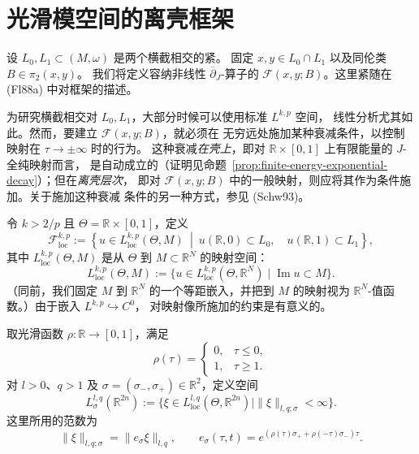 \section{光滑\personFloer{}模空间的离壳框架}
\label{sec:off-shell-framework-smooth-floer}

设 $L_0,L_1\subset(M,\omega)$ 是两个横截相交的紧\termLagrangianSubmanifold{}。
固定 $x,y\in L_0\cap L_1$ 以及同伦类 $B\in\pi_2(x,y)$。
我们将定义容纳非线性 $\overline\partial_J$-算子的\termBanachManifold{}
$\mathcal F(x,y;B)$。这里紧随\personFloer{}在 (Fl88a) 中对\termWeightedSobolevSpace{}框架的描述。

\begin{remark}
\label{rem:weighted-off-shell-decay}
为研究横截相交对 $L_0,L_1$，大部分时候可以使用标准 $L^{k,p}$ \personSobolev{}空间，
线性分析尤其如此。然而，要建立\termBanachManifold{} $\mathcal F(x,y;B)$，就必须在
无穷远处施加某种衰减条件，以控制映射在 $\tau\to\pm\infty$ 时的行为。
这种衰减\emph{在壳上}，即对 $\mathbb R\times[0,1]$ 上有限能量的 $J$-全纯映射而言，
是自动成立的（证明见命题~\ref{prop:finite-energy-exponential-decay}）；但在\emph{离壳层次}，
即对 $\mathcal F(x,y;B)$ 中的一般映射，则应将其作为条件施加。关于施加这种衰减
条件的另一种方式，参见 (Schw93)。
\end{remark}

令 $k>2/p$ 且 $\Theta=\mathbb R\times[0,1]$，定义
\[
 \mathcal F_{\mathrm{loc}}^{k,p}
 :=\left\{u\in L_{\mathrm{loc}}^{k,p}(\Theta,M)\ \middle|\
 u(\mathbb R,0)\subset L_0,\quad u(\mathbb R,1)\subset L_1\right\},
\]
其中 $L_{\mathrm{loc}}^{k,p}(\Theta,M)$ 是从 $\Theta$ 到 $M\subset\mathbb R^N$
的\personSobolev{}映射空间：
\[
 L_{\mathrm{loc}}^{k,p}(\Theta,M)
 :=\{u\in L_{\mathrm{loc}}^{k,p}(\Theta,\mathbb R^N)\mid\operatorname{Im}u\subset M\}.
\]
（同前，我们固定 $M$ 到 $\mathbb R^N$ 的一个等距嵌入，并把到 $M$ 的映射视为
$\mathbb R^N$-值函数。）由于\personSobolev{}嵌入 $L^{k,p}\hookrightarrow C^0$，
对映射像所施加的约束是有意义的。

取光滑函数 $\rho:\mathbb R\to[0,1]$，满足
\begin{equation}
 \rho(\tau)=
 \begin{cases}
 0,&\tau\leq0,\\
 1,&\tau\geq1.
 \end{cases}
 \label{eq:ch15-weight-cutoff}
\end{equation}
对 $l>0$、$q>1$ 及 $\sigma=(\sigma_-,\sigma_+)\in\mathbb R^2$，定义\personBanach{}空间
\[
 L_\sigma^{l,q}(\mathbb R^{2n})
 :=\{\xi\in L_{\mathrm{loc}}^{l,q}(\Theta,\mathbb R^{2n})\mid
 \|\xi\|_{l,q;\sigma}<\infty\}.
\]
这里所用的范数为
\[
 \|\xi\|_{l,q;\sigma}=\|e_\sigma\xi\|_{l,q},
 \qquad
 e_\sigma(\tau,t)=e^{(\rho(\tau)\sigma_++\rho(-\tau)\sigma_-)\tau}.
\]

